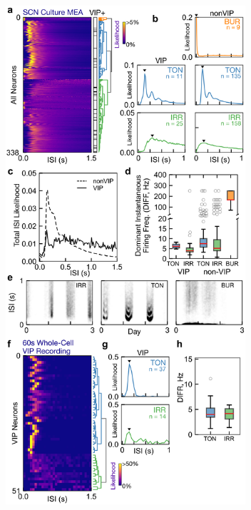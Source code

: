 \begin{figure}[p]
    \begin{center}
        \includegraphics[width=3.5in]{chap5/figures/Figure2.png}
    \end{center}
\end{figure}
\clearpage

